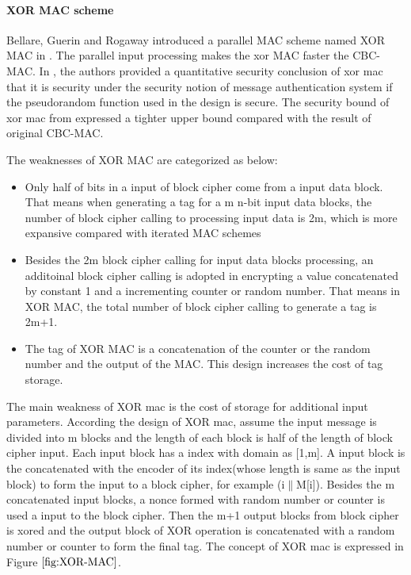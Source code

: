 \documentclass{article}
\begin{document}
\paragraph{XOR MAC scheme}
Bellare, Guerin and Rogaway introduced a parallel MAC scheme named XOR MAC in \cite{xor-mac}. 
The parallel input processing makes the xor MAC faster the CBC-MAC. 
In \cite{xor-mac}, the authors provided a quantitative security conclusion of xor mac that it is security under the security notion of message authentication system if the pseudorandom function used in the design is secure. The security bound of xor mac from \cite{xor-mac} expressed a tighter upper bound compared with the result of original CBC-MAC. 

The weaknesses of XOR MAC are categorized as below:
\begin{itemize}
	\item Only half of bits in a input of block cipher come from a input data block. That means when generating a tag for a m n-bit input data blocks, the number of block cipher calling to processing input data is 2m, which is more expansive compared with iterated MAC schemes 
	\item Besides the 2m block cipher calling for input data blocks processing, an additoinal block cipher calling is adopted in encrypting a value concatenated by constant 1 and a incrementing counter or random number. That means in XOR MAC, the total number of block cipher calling to generate a tag is 2m+1. 
	\item The tag of XOR MAC is a concatenation of the counter or the random number and the output of the MAC. This design increases the cost of tag storage.
\end{itemize}

The main weakness of XOR mac is the cost of storage for additional input parameters. According the design of XOR mac, assume the input message is divided into m blocks and the length of each block is half of the length of block cipher input. Each input block has a index with domain as [1,m]. A input block is the concatenated with the encoder of its index(whose length is same as the input block) to form the input to a block cipher, for example (i$\|$M[i]). Besides the m concatenated input blocks, a nonce formed with random number or counter is used a input to the block cipher. Then the m+1 output blocks from block cipher is xored and the output block of XOR operation is concatenated with a random number or counter to form the final tag. The concept of XOR mac is expressed in Figure $\ref{fig:XOR-MAC}$. 
\end{document}
